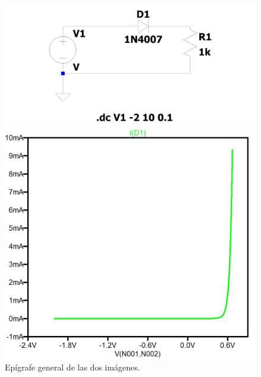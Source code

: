 \documentclass[chaptersright]{informeutn}
\begin{document}
 
\begin{figure}[h]
  \centering
  \begin{minipage}{0.45\textwidth}
    \centering
    \includegraphics[width=\linewidth]{pictures/curva_diodo_silicio_circuito.jpeg}
  \end{minipage}
  \hfill
  \begin{minipage}{0.45\textwidth}
    \centering
    \includegraphics[width=\linewidth]{pictures/curva_diodo_silicio_grafico.jpeg}
  \end{minipage}

  \vspace{0.5cm}
  
  \caption{Epígrafe general de las dos imágenes.}
  \label{c}
\end{figure}
\end{document}
